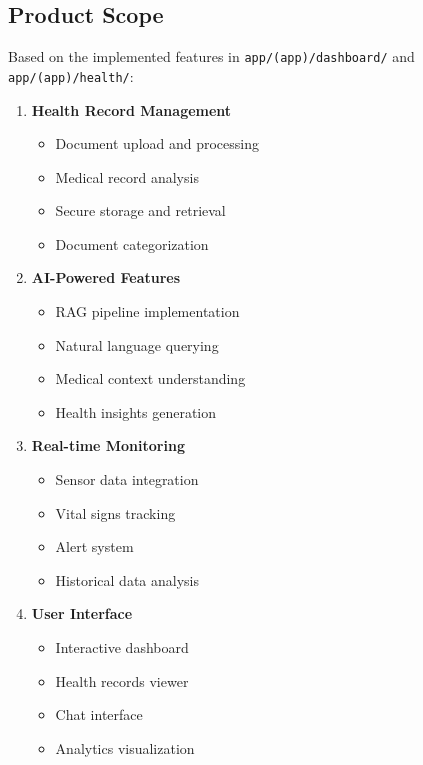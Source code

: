 \subsection{Product Scope}
Based on the implemented features in \texttt{app/(app)/dashboard/} and \texttt{app/(app)/health/}:

\begin{enumerate}
    \item \textbf{Health Record Management}
    \begin{itemize}
        \item Document upload and processing
        \item Medical record analysis
        \item Secure storage and retrieval
        \item Document categorization
    \end{itemize}

    \item \textbf{AI-Powered Features}
    \begin{itemize}
        \item RAG pipeline implementation
        \item Natural language querying
        \item Medical context understanding
        \item Health insights generation
    \end{itemize}

    \item \textbf{Real-time Monitoring}
    \begin{itemize}
        \item Sensor data integration
        \item Vital signs tracking
        \item Alert system
        \item Historical data analysis
    \end{itemize}

    \item \textbf{User Interface}
    \begin{itemize}
        \item Interactive dashboard
        \item Health records viewer
        \item Chat interface
        \item Analytics visualization
    \end{itemize}
\end{enumerate} 